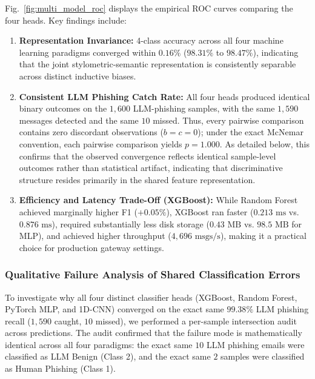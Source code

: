 \documentclass[journal]{IEEEtran}
\begin{document}
Fig.~\ref{fig:multi_model_roc} displays the empirical ROC curves comparing the four heads. Key findings include:
\begin{enumerate}
    \item \textbf{Representation Invariance:} 4-class accuracy across all four machine learning paradigms converged within $0.16\%$ ($98.31\%$ to $98.47\%$), indicating that the joint stylometric-semantic representation is consistently separable across distinct inductive biases.
    \item \textbf{Consistent LLM Phishing Catch Rate:} All four heads produced identical binary outcomes on the $1,600$ LLM-phishing samples, with the same $1,590$ messages detected and the same $10$ missed. Thus, every pairwise comparison contains zero discordant observations ($b=c=0$); under the exact McNemar convention, each pairwise comparison yields $p=1.000$. As detailed below, this confirms that the observed convergence reflects identical sample-level outcomes rather than statistical artifact, indicating that discriminative structure resides primarily in the shared feature representation.
    \item \textbf{Efficiency and Latency Trade-Off (XGBoost):} While Random Forest achieved marginally higher F1 ($+0.05\%$), XGBoost ran faster ($0.213\text{ ms}$ vs. $0.876\text{ ms}$), required substantially less disk storage ($0.43\text{ MB}$ vs. $98.5\text{ MB}$ for MLP), and achieved higher throughput ($4{,}696\text{ msgs/s}$), making it a practical choice for production gateway settings.
\end{enumerate}


\subsubsection{Qualitative Failure Analysis of Shared Classification Errors}
To investigate why all four distinct classifier heads (XGBoost, Random Forest, PyTorch MLP, and 1D-CNN) converged on the exact same $99.38\%$ LLM phishing recall ($1,590$ caught, $10$ missed), we performed a per-sample intersection audit across predictions. The audit confirmed that the failure mode is mathematically identical across all four paradigms: the exact same $10$ LLM phishing emails were classified as LLM Benign (Class 2), and the exact same $2$ samples were classified as Human Phishing (Class 1).
\end{document}
